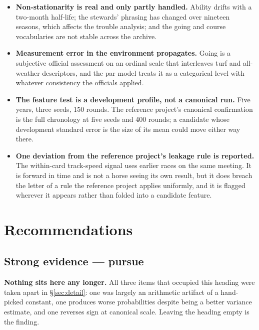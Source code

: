 \documentclass[11pt,a4paper]{article}
\begin{document}
\begin{itemize}
\item \textbf{Non-stationarity is real and only partly handled.} Ability drifts
with a two-month half-life; the stewards' phrasing has changed over nineteen
seasons, which affects the trouble analysis; and the going and course
vocabularies are not stable across the archive.

\item \textbf{Measurement error in the environment propagates.} Going is a
subjective official assessment on an ordinal scale that interleaves turf and
all-weather descriptors, and the par model treats it as a categorical level with
whatever consistency the officials applied.

\item \textbf{The feature test is a development profile, not a canonical run.}
Five years, three seeds, 150 rounds. The reference project's canonical
confirmation is the full chronology at five seeds and 400 rounds; a candidate
whose development standard error is the size of its mean could move either way
there.

\item \textbf{One deviation from the reference project's leakage rule is
reported.} The within-card track-speed signal uses earlier races on the same
meeting. It is forward in time and is not a horse seeing its own result, but it
does breach the letter of a rule the reference project applies uniformly, and it
is flagged wherever it appears rather than folded into a candidate feature.
\end{itemize}

\newpage
\section{Recommendations}

\subsection*{Strong evidence --- pursue}

\textbf{Nothing sits here any longer.} All three items that occupied this heading
were taken apart in \S\ref{sec:detail}: one was largely an arithmetic artifact of a
hand-picked constant, one produces worse probabilities despite being a better
variance estimate, and one reverses sign at canonical scale. Leaving the heading
empty is the finding.
\end{document}
